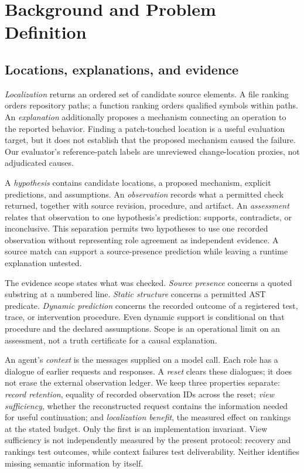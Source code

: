 \documentclass[letterpaper,journal]{IEEEtran}
\begin{document}
\section{Background and Problem Definition}\label{sec:background}
\subsection{Locations, explanations, and evidence}
\emph{Localization} returns an ordered set of candidate source elements. A file ranking orders repository paths; a function ranking orders qualified symbols within paths. An \emph{explanation} additionally proposes a mechanism connecting an operation to the reported behavior. Finding a patch-touched location is a useful evaluation target, but it does not establish that the proposed mechanism caused the failure. Our evaluator's reference-patch labels are unreviewed change-location proxies, not adjudicated causes.

A \emph{hypothesis} contains candidate locations, a proposed mechanism, explicit predictions, and assumptions. An \emph{observation} records what a permitted check returned, together with source revision, procedure, and artifact. An \emph{assessment} relates that observation to one hypothesis's prediction: supports, contradicts, or inconclusive. This separation permits two hypotheses to use one recorded observation without representing role agreement as independent evidence. A source match can support a source-presence prediction while leaving a runtime explanation untested.

The evidence scope states what was checked. \emph{Source presence} concerns a quoted substring at a numbered line. \emph{Static structure} concerns a permitted AST predicate. \emph{Dynamic prediction} concerns the recorded outcome of a registered test, trace, or intervention procedure. Even dynamic support is conditional on that procedure and the declared assumptions. Scope is an operational limit on an assessment, not a truth certificate for a causal explanation.

An agent's \emph{context} is the messages supplied on a model call. Each role has a dialogue of earlier requests and responses. A \emph{reset} clears these dialogues; it does not erase the external observation ledger. We keep three properties separate: \emph{record retention}, equality of recorded observation IDs across the reset; \emph{view sufficiency}, whether the reconstructed request contains the information needed for useful continuation; and \emph{localization benefit}, the measured effect on rankings at the stated budget. Only the first is an implementation invariant. View sufficiency is not independently measured by the present protocol: recovery and rankings test outcomes, while context failures test deliverability. Neither identifies missing semantic information by itself.
\end{document}
